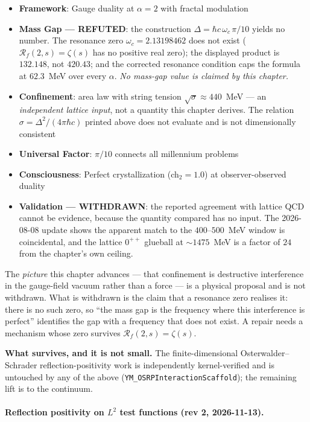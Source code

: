 \begin{itemize}
\item \textbf{Framework}: Gauge duality at $\alpha = 2$ with fractal modulation
\item \textbf{Mass Gap --- REFUTED}: the construction
$\Delta = \hbar c\,\omega_c\,\pi/10$ yields no number. The resonance zero
$\omega_c = 2.13198462$ does not exist ($\mathcal{R}_f(2,s)=\zeta(s)$ has no
positive real zero); the displayed product is $132.148$, not $420.43$; and the
corrected resonance condition caps the formula at $62.3$~MeV over every
$\alpha$. \emph{No mass-gap value is claimed by this chapter.}
\item \textbf{Confinement}: area law with string tension
$\sqrt{\sigma} \approx 440$~MeV --- an \emph{independent lattice input}, not a
quantity this chapter derives. The relation $\sigma = \Delta^2/(4\pi\hbar c)$
printed above does not evaluate and is not dimensionally consistent
\item \textbf{Universal Factor}: $\pi/10$ connects all millennium problems
\item \textbf{Consciousness}: Perfect crystallization (ch$_2 = 1.0$) at observer-observed duality
\item \textbf{Validation --- WITHDRAWN}: the reported agreement with lattice
QCD cannot be evidence, because the quantity compared has no input. The
2026-08-08 update shows the apparent match to the $400$--$500$~MeV window is
coincidental, and the lattice $0^{++}$ glueball at ${\sim}1475$~MeV is a factor
of $24$ from the chapter's own ceiling.
\end{itemize}

The \emph{picture} this chapter advances --- that confinement is destructive
interference in the gauge-field vacuum rather than a force --- is a physical
proposal and is not withdrawn. What is withdrawn is the claim that a resonance
zero realises it: there is no such zero, so ``the mass gap is the frequency
where this interference is perfect'' identifies the gap with a frequency that
does not exist. A repair needs a mechanism whose zero survives
$\mathcal{R}_f(2,s)=\zeta(s)$.

\textbf{What survives, and it is not small.} The finite-dimensional
Osterwalder--Schrader reflection-positivity work is independently
kernel-verified and is untouched by any of the above
(\texttt{YM\_OSRPInteractionScaffold}); the remaining lift is to the
continuum.

\paragraph{Reflection positivity on $L^2$ test functions (rev 2, 2026-11-13).}


